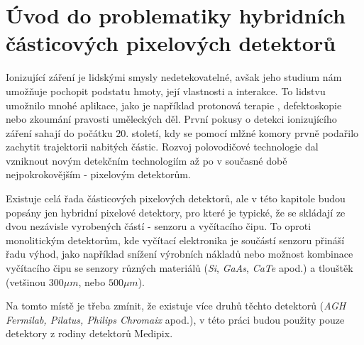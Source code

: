 

\chapter{Úvod do problematiky hybridních částicových pixelových detektorů}\label{chap:detectors}
Ionizující záření je lidskými smysly nedetekovatelné, avšak jeho studium nám umožňuje pochopit podstatu hmoty, její vlastnosti a interakce. To lidstvu umožnilo mnohé aplikace, jako je například protonová terapie \cite{tpx_app_radiotherapy}, defektoskopie nebo zkoumání pravosti uměleckých děl. První pokusy o detekci ionizujícího záření sahají do počátku 20. století, kdy se pomocí mlžné komory prvně podařilo zachytit trajektorii nabitých částic. Rozvoj polovodičové technologie dal vzniknout novým detekčním technologiím až po v současné době nejpokrokovějším - pixelovým detektorům.

Existuje celá řada částicových pixelových detektorů, ale v této kapitole budou popsány jen hybridní pixelové detektory, pro které je typické, že se skládají ze dvou nezávisle vyrobených částí - senzoru a vyčítacího čipu. To oproti monolitickým detektorům, kde vyčítací elektronika je součástí senzoru přináší řadu výhod, jako například snížení výrobních nákladů nebo možnost kombinace vyčítacího čipu se senzory různých materiálů (\textit{Si}, \textit{GaAs}, \textit{CaTe} apod.) a tlouštěk (vetšinou $300\mu m$, nebo $500\mu m$).

Na tomto místě je třeba zmínit, že existuje více druhů těchto detektorů (\textit{AGH Fermilab, Pilatus, Philips Chromaix} apod.)\cite{detectors_review}, v této práci budou použity pouze detektory z rodiny detektorů Medipix.

